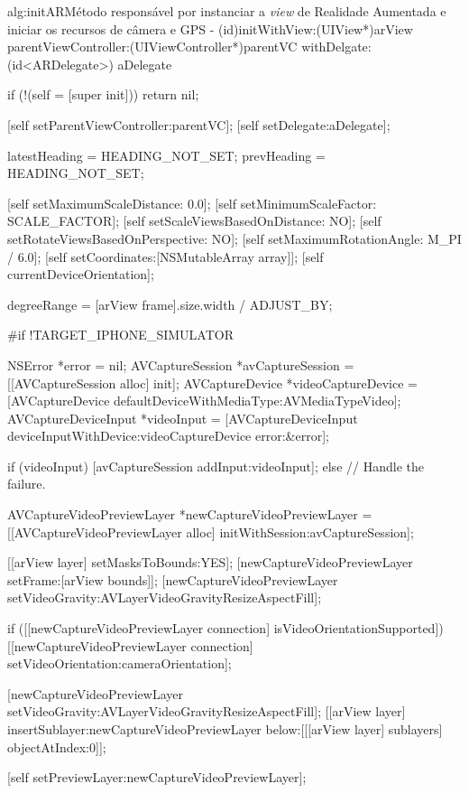 \begin{sourcecode}{alg:initAR}{Método responsável por instanciar a \textit{view} de Realidade Aumentada e iniciar os recursos de câmera e GPS}
- (id)initWithView:(UIView*)arView parentViewController:(UIViewController*)parentVC withDelgate:(id<ARDelegate>) aDelegate
{    
    if (!(self = [super init]))
		return nil;

    [self setParentViewController:parentVC];
    [self setDelegate:aDelegate];

    latestHeading   = HEADING_NOT_SET;
    prevHeading     = HEADING_NOT_SET;

    [self setMaximumScaleDistance: 0.0];
	[self setMinimumScaleFactor: SCALE_FACTOR];
	[self setScaleViewsBasedOnDistance: NO];
	[self setRotateViewsBasedOnPerspective: NO];
	[self setMaximumRotationAngle: M_PI / 6.0];
    [self setCoordinates:[NSMutableArray array]];
    [self currentDeviceOrientation];

	degreeRange = [arView frame].size.width / ADJUST_BY;

#if !TARGET_IPHONE_SIMULATOR

    NSError *error = nil;
    AVCaptureSession *avCaptureSession = [[AVCaptureSession alloc] init];
    AVCaptureDevice *videoCaptureDevice = [AVCaptureDevice defaultDeviceWithMediaType:AVMediaTypeVideo];
    AVCaptureDeviceInput *videoInput = [AVCaptureDeviceInput deviceInputWithDevice:videoCaptureDevice error:&error];

    if (videoInput) {
        [avCaptureSession addInput:videoInput];
    }
    else {
        // Handle the failure.
    }

    AVCaptureVideoPreviewLayer *newCaptureVideoPreviewLayer = [[AVCaptureVideoPreviewLayer alloc] initWithSession:avCaptureSession];

    [[arView layer] setMasksToBounds:YES];
    [newCaptureVideoPreviewLayer setFrame:[arView bounds]];
    [newCaptureVideoPreviewLayer setVideoGravity:AVLayerVideoGravityResizeAspectFill];

    if ([[newCaptureVideoPreviewLayer connection] isVideoOrientationSupported])
        [[newCaptureVideoPreviewLayer connection] setVideoOrientation:cameraOrientation];

    [newCaptureVideoPreviewLayer setVideoGravity:AVLayerVideoGravityResizeAspectFill];
    [[arView layer] insertSublayer:newCaptureVideoPreviewLayer below:[[[arView layer] sublayers] objectAtIndex:0]];

    [self setPreviewLayer:newCaptureVideoPreviewLayer];

}
\end{sourcecode}
